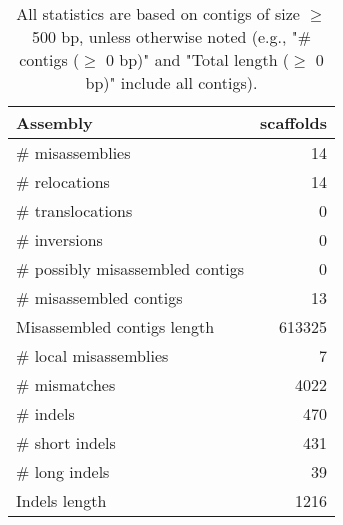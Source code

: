 \documentclass[12pt,a4paper]{article}
\begin{document}
\begin{table}[ht]
\begin{center}
\caption{All statistics are based on contigs of size $\geq$ 500 bp, unless otherwise noted (e.g., "\# contigs ($\geq$ 0 bp)" and "Total length ($\geq$ 0 bp)" include all contigs).}
\begin{tabular}{|l*{1}{|r}|}
\hline
Assembly & scaffolds \\ \hline
\# misassemblies & 14 \\ \hline
\hspace{5mm}\# relocations & 14 \\ \hline
\hspace{5mm}\# translocations & 0 \\ \hline
\hspace{5mm}\# inversions & 0 \\ \hline
\# possibly misassembled contigs & 0 \\ \hline
\# misassembled contigs & 13 \\ \hline
Misassembled contigs length & 613325 \\ \hline
\# local misassemblies & 7 \\ \hline
\# mismatches & 4022 \\ \hline
\# indels & 470 \\ \hline
\hspace{5mm}\# short indels & 431 \\ \hline
\hspace{5mm}\# long indels & 39 \\ \hline
Indels length & 1216 \\ \hline
\end{tabular}
\end{center}
\end{table}
\end{document}
